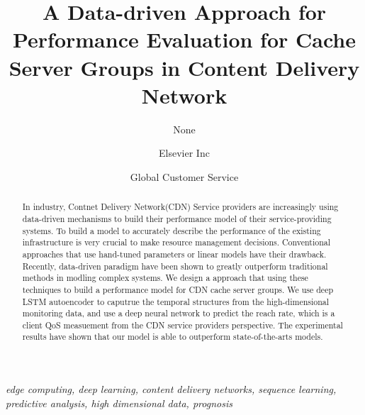 \documentclass[5p]{elsarticle}
\newcommand{\dabiaolv}{reach rate}
\begin{document}
\begin{frontmatter}

\title{A Data-driven Approach for Performance Evaluation for Cache Server Groups in Content Delivery Network
    }

\author{None
    }
\address{Radarweg 29, Amsterdam}

\author[mymainaddress,mysecondaryaddress]{Elsevier Inc}

\author[mysecondaryaddress]{Global Customer Service}

\address[mymainaddress]{1600 John F Kennedy Boulevard, Philadelphia}
\address[mysecondaryaddress]{360 Park Avenue South, New York}

\begin{abstract}
In industry, Contnet Delivery Network(CDN) Service providers are increasingly using data-driven mechanisms to build their performance model of their service-providing systems. To build a model to accurately describe the performance of the existing infrastructure is very crucial to make resource management decisions. Conventional approaches that use hand-tuned parameters or linear models have their drawback. Recently, data-driven paradigm have been shown to greatly outperform traditional methods in modling complex systems. We design a approach that using these techniques to build a performance model for CDN cache server groups. We use deep LSTM autoencoder to caputrue the temporal structures from the high-dimensional monitoring data, and use a deep neural network to predict the \dabiaolv, which is a client QoS measuement from the CDN service providers perspective. The experimental results have shown that our model is able to outperform state-of-the-arts models.
\end{abstract}
\begin{keyword}
\textit{edge computing, deep learning, content delivery networks, sequence learning, predictive analysis, high dimensional data, prognosis}
\end{keyword}
\end{frontmatter}
\linenumbers
\end{document}
